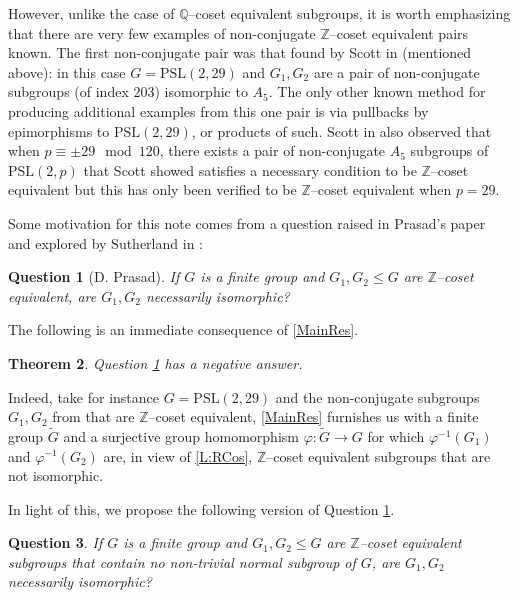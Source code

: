 \documentclass[11pt]{amsart}
\newtheorem{thm}{Theorem}[section]
\newtheorem{question}[thm]{Question}
\numberwithin{equation}{section}
\begin{document}
However, unlike the case of  $\mathbb{Q}$--coset equivalent subgroups, it is worth emphasizing that there are very few examples of non-conjugate $\mathbb{Z}$--coset equivalent pairs known. The first non-conjugate pair was that found by Scott in \cite{Scott} (mentioned above): in this case $G = \mathrm{PSL}(2,29)$ and $G_1,G_2$ are a pair of non-conjugate  subgroups (of index $203$) isomorphic to $A_5$. The only other known method for producing additional examples from this one pair is via pullbacks by epimorphisms to $\mathrm{PSL}(2, 29)$, or products of such. Scott in \cite{Scott} also observed that when $p \equiv \pm 29 \mod 120$, there exists a pair of non-conjugate $A_5$ subgroups of $\mathrm{PSL}(2,p)$ that Scott showed satisfies a necessary condition to be $\mathbb{Z}$--coset equivalent but this has only been verified to be $\mathbb{Z}$--coset equivalent when $p=29$.  

Some motivation for this note comes from a question raised in Prasad's paper \cite{Prasad} and explored by Sutherland in \cite{Sutherland}:

\begin{question}[D. Prasad]\label{finite_iso} 
If $G$ is a finite group and $G_1,G_2 \leq G$ are $\mathbb{Z}$--coset equivalent, are $G_1,G_2$ necessarily isomorphic?
\end{question}

The following is an immediate consequence of \cref{MainRes}.

\begin{thm} \label{MainCor}
Question \ref{finite_iso} has a negative answer.
\end{thm}

Indeed, take for instance $G = \mathrm{PSL}(2,29)$ and the non-conjugate subgroups $G_1, G_2$ from \cite{Scott} that are $\mathbb Z$--coset equivalent, \cref{MainRes} furnishes us with a finite group $\widetilde G$ and a surjective group homomorphism $\varphi \colon \widetilde G \to G$ for which $\varphi^{-1}(G_1)$ and $\varphi^{-1}(G_2)$ are, in view of \cref{L:RCos}, $\mathbb Z$--coset equivalent subgroups that are not isomorphic.

In light of this, we propose the following version of Question \ref{finite_iso}.

\begin{question}
If $G$ is a finite group and $G_1,G_2 \leq G$ are $\mathbb{Z}$--coset equivalent subgroups that contain no non-trivial normal subgroup of $G$, are $G_1,G_2$ necessarily isomorphic?
\end{question}
\end{document}
